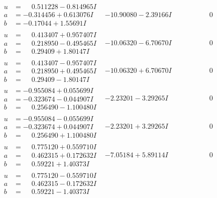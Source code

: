 \documentclass[1p]{elsarticle_modified}
\theoremstyle{definition}
\begin{document}
$$\begin{array}{c|c|c}
\begin{aligned}
u &= \phantom{-}0.511228 - 0.814965 I \\
a &= -0.314456 + 0.613076 I \\
b &= -0.17044 + 1.55691 I\end{aligned}
 & -10.90080 - 2.39166 I & \phantom{-0.000000 } 0 \\ \hline\begin{aligned}
u &= \phantom{-}0.413407 + 0.957407 I \\
a &= \phantom{-}0.218950 - 0.495465 I \\
b &= \phantom{-}0.29409 + 1.80147 I\end{aligned}
 & -10.06320 - 6.70670 I & \phantom{-0.000000 } 0 \\ \hline\begin{aligned}
u &= \phantom{-}0.413407 - 0.957407 I \\
a &= \phantom{-}0.218950 + 0.495465 I \\
b &= \phantom{-}0.29409 - 1.80147 I\end{aligned}
 & -10.06320 + 6.70670 I & \phantom{-0.000000 } 0 \\ \hline\begin{aligned}
u &= -0.955084 + 0.055699 I \\
a &= -0.323674 - 0.044907 I \\
b &= \phantom{-}0.256490 - 1.100480 I\end{aligned}
 & -2.23201 - 3.29265 I & \phantom{-0.000000 } 0 \\ \hline\begin{aligned}
u &= -0.955084 - 0.055699 I \\
a &= -0.323674 + 0.044907 I \\
b &= \phantom{-}0.256490 + 1.100480 I\end{aligned}
 & -2.23201 + 3.29265 I & \phantom{-0.000000 } 0 \\ \hline\begin{aligned}
u &= \phantom{-}0.775120 + 0.559710 I \\
a &= \phantom{-}0.462315 + 0.172632 I \\
b &= \phantom{-}0.59221 + 1.40373 I\end{aligned}
 & -7.05184 + 5.89114 I & \phantom{-0.000000 } 0 \\ \hline\begin{aligned}
u &= \phantom{-}0.775120 - 0.559710 I \\
a &= \phantom{-}0.462315 - 0.172632 I \\
b &= \phantom{-}0.59221 - 1.40373 I\end{aligned}

\end{array}$$
\end{document}
